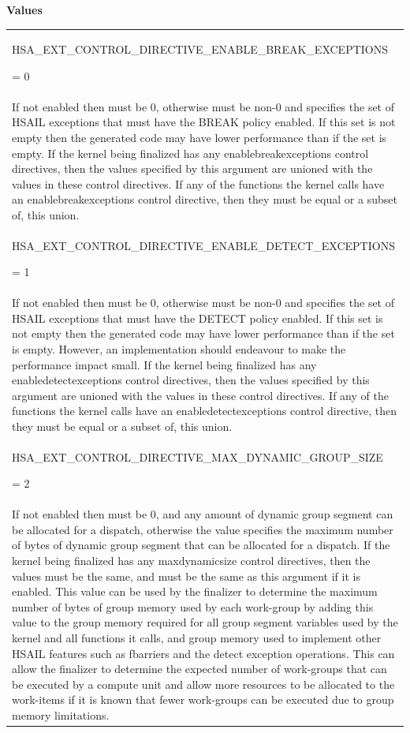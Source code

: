 \documentclass[final]{book}
\newcommand{\reftyp}[1]{#1}
\newcommand{\refenu}[1]{\reftyp{#1}}
\begin{document}
\noindent\textbf{Values}\\[-5mm]
\begin{longtable}{@{\hspace{2em}}p{\linewidth-2em}}
\hspace{-2em}\hypertarget{group__finalizer_1gga143d9e622dfd7889d52fb5eb5ed1ffdba1c209f3a9fd22b358006c221303f8893}{\refenu{HSA_\-EXT_\-CONTROL_\-DIRECTIVE_\-ENABLE_\-BREAK_\-EXCEPTIONS}} = 0\\If not enabled then must be 0, otherwise must be non-0 and specifies the set of HSAIL exceptions that must have the BREAK policy enabled. If this set is not empty then the generated code may have lower performance than if the set is empty. If the kernel being finalized has any enablebreakexceptions control directives, then the values specified by this argument are unioned with the values in these control directives. If any of the functions the kernel calls have an enablebreakexceptions control directive, then they must be equal or a subset of, this union.\\[2mm]
\hspace{-2em}\hypertarget{group__finalizer_1gga143d9e622dfd7889d52fb5eb5ed1ffdba5f6e061c9abd08976ee6f4c4ee48f30a}{\refenu{HSA_\-EXT_\-CONTROL_\-DIRECTIVE_\-ENABLE_\-DETECT_\-EXCEPTIONS}} = 1\\If not enabled then must be 0, otherwise must be non-0 and specifies the set of HSAIL exceptions that must have the DETECT policy enabled. If this set is not empty then the generated code may have lower performance than if the set is empty. However, an implementation should endeavour to make the performance impact small. If the kernel being finalized has any enabledetectexceptions control directives, then the values specified by this argument are unioned with the values in these control directives. If any of the functions the kernel calls have an enabledetectexceptions control directive, then they must be equal or a subset of, this union.\\[2mm]
\hspace{-2em}\hypertarget{group__finalizer_1gga143d9e622dfd7889d52fb5eb5ed1ffdba7787b99c887699ca6fe8d1cd4de3477e}{\refenu{HSA_\-EXT_\-CONTROL_\-DIRECTIVE_\-MAX_\-DYNAMIC_\-GROUP_\-SIZE}} = 2\\If not enabled then must be 0, and any amount of dynamic group segment can be allocated for a dispatch, otherwise the value specifies the maximum number of bytes of dynamic group segment that can be allocated for a dispatch. If the kernel being finalized has any maxdynamicsize control directives, then the values must be the same, and must be the same as this argument if it is enabled. This value can be used by the finalizer to determine the maximum number of bytes of group memory used by each work-group by adding this value to the group memory required for all group segment variables used by the kernel and all functions it calls, and group memory used to implement other HSAIL features such as fbarriers and the detect exception operations. This can allow the finalizer to determine the expected number of work-groups that can be executed by a compute unit and allow more resources to be allocated to the work-items if it is known that fewer work-groups can be executed due to group memory limitations.\\[2mm]

\end{longtable}
\end{document}

